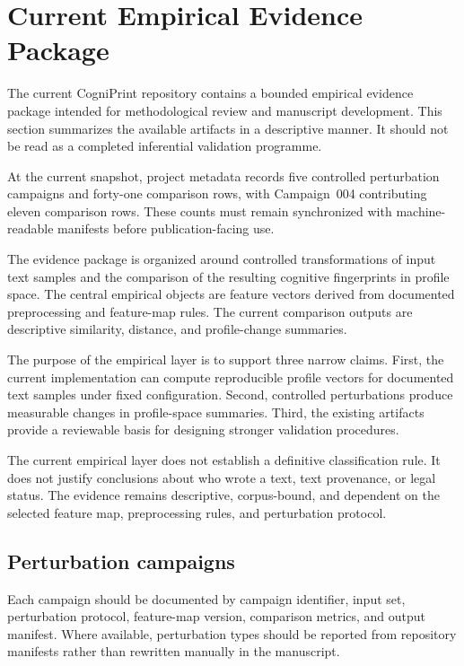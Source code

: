 \section{Current Empirical Evidence Package}
\label{sec:current-empirical-evidence}

The current CogniPrint repository contains a bounded empirical evidence package intended for methodological review and manuscript development. This section summarizes the available artifacts in a descriptive manner. It should not be read as a completed inferential validation programme.

At the current snapshot, project metadata records five controlled perturbation campaigns and forty-one comparison rows, with Campaign~004 contributing eleven comparison rows. These counts must remain synchronized with machine-readable manifests before publication-facing use.

The evidence package is organized around controlled transformations of input text samples and the comparison of the resulting cognitive fingerprints in profile space. The central empirical objects are feature vectors derived from documented preprocessing and feature-map rules. The current comparison outputs are descriptive similarity, distance, and profile-change summaries.

The purpose of the empirical layer is to support three narrow claims. First, the current implementation can compute reproducible profile vectors for documented text samples under fixed configuration. Second, controlled perturbations produce measurable changes in profile-space summaries. Third, the existing artifacts provide a reviewable basis for designing stronger validation procedures.

The current empirical layer does not establish a definitive classification rule. It does not justify conclusions about who wrote a text, text provenance, or legal status. The evidence remains descriptive, corpus-bound, and dependent on the selected feature map, preprocessing rules, and perturbation protocol.

\subsection{Perturbation campaigns}

Each campaign should be documented by campaign identifier, input set, perturbation protocol, feature-map version, comparison metrics, and output manifest. Where available, perturbation types should be reported from repository manifests rather than rewritten manually in the manuscript.

